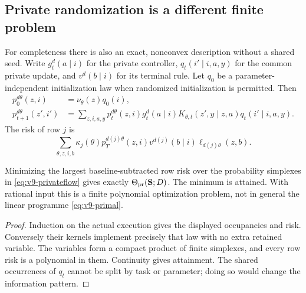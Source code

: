 \subsection{Private randomization is a different finite problem}
For completeness there is also an exact, nonconvex description without
a shared seed. Write $g_t^d(a\mid i)$ for the private controller,
$q_t(i'\mid i,a,y)$ for the common private update, and
$v^d(b\mid i)$ for its terminal rule. Let $q_0$ be a parameter-independent
initialization law when randomized initialization is permitted. Then
\begin{align}
 p_0^{d\theta}(z,i)&=\nu_\theta(z)q_0(i),\nonumber\\
 p_{t+1}^{d\theta}(z',i')
 &=\sum_{z,i,a,y}p_t^{d\theta}(z,i)g_t^d(a\mid i)
       K_{\theta,t}(z',y\mid z,a)q_t(i'\mid i,a,y).
 \label{eq:v9-privateflow}
\end{align}
The risk of row $j$ is
\[
 \sum_{\theta,z,i,b}\kappa_j(\theta)p_T^{d(j)\theta}(z,i)
                    v^{d(j)}(b\mid i)\ell_{d(j)\theta}(z,b).
\]
\begin{proposition}\label{prop:v9-private}
Minimizing the largest baseline-subtracted row risk over the probability
simplexes in \eqref{eq:v9-privateflow} gives exactly
$\Theta_{\rm pr}({\bf S};D)$. The minimum is attained. With rational input
this is a finite polynomial optimization problem, not in general the
linear programme \eqref{eq:v9-primal}.
\end{proposition}
\begin{proof}
Induction on the actual execution gives the displayed occupancies and
risk. Conversely their kernels implement precisely that law with no
extra retained variable. The variables form a compact product of finite
simplexes, and every row risk is a polynomial in them. Continuity gives
attainment. The shared occurrences of $q_t$ cannot be split by task or
parameter; doing so would change the information pattern.
\end{proof}

